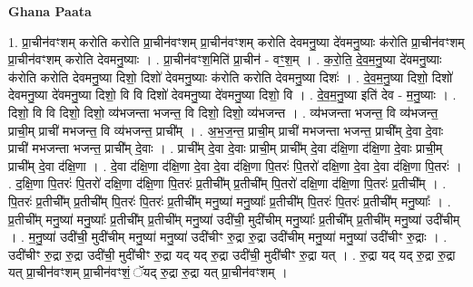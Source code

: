 \documentclass[17pt]{extarticle}
\begin{document}
\textbf{Ghana Paata } \newline

1. प्रा॒चीन॑वꣳशम् करोति करोति प्रा॒चीन॑वꣳशम् प्रा॒चीन॑वꣳशम् करोति देवमनु॒ष्या दे॑वमनु॒ष्याः क॑रोति प्रा॒चीन॑वꣳशम् प्रा॒चीन॑वꣳशम् करोति देवमनु॒ष्याः । . प्रा॒चीन॑वꣳश॒मिति॑ प्रा॒चीन॑ - वꣳ॒॒श॒म् । . क॒रो॒ति॒ दे॒व॒म॒नु॒ष्या दे॑वमनु॒ष्याः क॑रोति करोति देवमनु॒ष्या दिशो॒ दिशो॑ देवमनु॒ष्याः क॑रोति करोति देवमनु॒ष्या दिशः॑ । . दे॒व॒म॒नु॒ष्या दिशो॒ दिशो॑ देवमनु॒ष्या दे॑वमनु॒ष्या दिशो॒ वि वि दिशो॑ देवमनु॒ष्या दे॑वमनु॒ष्या दिशो॒ वि । . दे॒व॒म॒नु॒ष्या इति॑ देव - म॒नु॒ष्याः । . दिशो॒ वि वि दिशो॒ दिशो॒ व्य॑भजन्ता भजन्त॒ वि दिशो॒ दिशो॒ व्य॑भजन्त । . व्य॑भजन्ता भजन्त॒ वि व्य॑भजन्त॒ प्राची॒म् प्राची॑ मभजन्त॒ वि व्य॑भजन्त॒ प्राची᳚म् । . अ॒भ॒ज॒न्त॒ प्राची॒म् प्राची॑ मभजन्ता भजन्त॒ प्राची᳚म् दे॒वा दे॒वाः प्राची॑ मभजन्ता भजन्त॒ प्राची᳚म् दे॒वाः । . प्राची᳚म् दे॒वा दे॒वाः प्राची॒म् प्राची᳚म् दे॒वा द॑क्षि॒णा द॑क्षि॒णा दे॒वाः प्राची॒म् प्राची᳚म् दे॒वा द॑क्षि॒णा । . दे॒वा द॑क्षि॒णा द॑क्षि॒णा दे॒वा दे॒वा द॑क्षि॒णा पि॒तरः॑ पि॒तरो॑ दक्षि॒णा दे॒वा दे॒वा द॑क्षि॒णा पि॒तरः॑ । . द॒क्षि॒णा पि॒तरः॑ पि॒तरो॑ दक्षि॒णा द॑क्षि॒णा पि॒तरः॑ प्र॒तीची᳚म् प्र॒तीची᳚म् पि॒तरो॑ दक्षि॒णा द॑क्षि॒णा पि॒तरः॑ प्र॒तीची᳚म् । . पि॒तरः॑ प्र॒तीची᳚म् प्र॒तीची᳚म् पि॒तरः॑ पि॒तरः॑ प्र॒तीची᳚म् मनु॒ष्या॑ मनु॒ष्याः᳚ प्र॒तीची᳚म् पि॒तरः॑ पि॒तरः॑ प्र॒तीची᳚म् मनु॒ष्याः᳚ । . प्र॒तीची᳚म् मनु॒ष्या॑ मनु॒ष्याः᳚ प्र॒तीची᳚म् प्र॒तीची᳚म् मनु॒ष्या॑ उदी॑ची॒ मुदी॑चीम् मनु॒ष्याः᳚ प्र॒तीची᳚म् प्र॒तीची᳚म् मनु॒ष्या॑ उदी॑चीम् । . म॒नु॒ष्या॑ उदी॑ची॒ मुदी॑चीम् मनु॒ष्या॑ मनु॒ष्या॑ उदी॑चीꣳ रु॒द्रा रु॒द्रा उदी॑चीम् मनु॒ष्या॑ मनु॒ष्या॑ उदी॑चीꣳ रु॒द्राः । . उदी॑चीꣳ रु॒द्रा रु॒द्रा उदी॑ची॒ मुदी॑चीꣳ रु॒द्रा यद् यद् रु॒द्रा उदी॑ची॒ मुदी॑चीꣳ रु॒द्रा यत् । . रु॒द्रा यद् यद् रु॒द्रा रु॒द्रा यत् प्रा॒चीन॑वꣳशम् प्रा॒चीन॑वꣳशं॒ ॅयद् रु॒द्रा रु॒द्रा यत् प्रा॒चीन॑वꣳशम् । \newline
\end{document}
